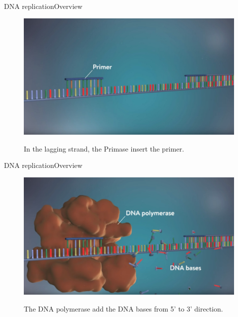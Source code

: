 \documentclass[10pt]{beamer}
\begin{document}
{%
\begin{frame}{DNA replication}{Overview}
	\begin{figure}[]
		\centering
		\includegraphics[width=\textwidth,height=0.6\textheight,keepaspectratio]{img/introduction/dna41.jpg}
		\label{img:mot2}
		\caption{In the lagging strand, the Primase insert the primer. }
	\end{figure}
\end{frame}


\begin{frame}{DNA replication}{Overview}
	\begin{figure}[]
		\centering
		\includegraphics[width=\textwidth,height=0.6\textheight,keepaspectratio]{img/introduction/dna42.jpg}
		\label{img:mot2}
		\caption{The DNA polymerase add the DNA bases from 5' to 3' direction. }
	\end{figure}
\end{frame}

}
\end{document}
